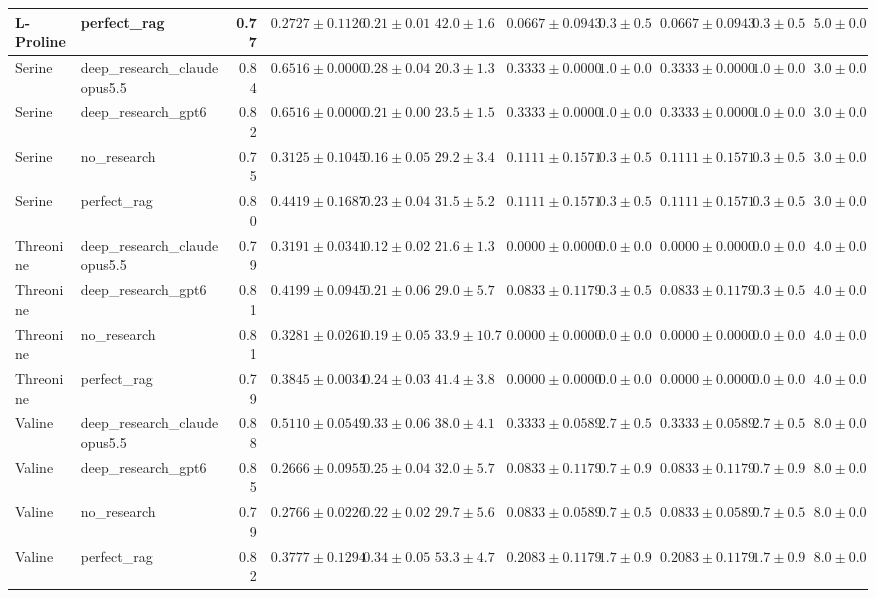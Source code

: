 \begin{table}[htbp]
\begin{tabular}{llrrrrrrrrr}
L-Proline & perfect_rag & 0.77 & $0.2727 \pm 0.1126$ & $0.21 \pm 0.01$ & $42.0 \pm 1.6$ & $0.0667 \pm 0.0943$ & $0.3 \pm 0.5$ & $0.0667 \pm 0.0943$ & $0.3 \pm 0.5$ & $5.0 \pm 0.0$ \\
\midrule
Serine & deep_research_claudeopus5.5 & 0.84 & \cellcolor{green!25}$0.6516 \pm 0.0000$ & $0.28 \pm 0.04$ & $20.3 \pm 1.3$ & $0.3333 \pm 0.0000$ & $1.0 \pm 0.0$ & $0.3333 \pm 0.0000$ & $1.0 \pm 0.0$ & $3.0 \pm 0.0$ \\
Serine & deep_research_gpt6 & 0.82 & \cellcolor{green!25}$0.6516 \pm 0.0000$ & $0.21 \pm 0.00$ & $23.5 \pm 1.5$ & $0.3333 \pm 0.0000$ & $1.0 \pm 0.0$ & $0.3333 \pm 0.0000$ & $1.0 \pm 0.0$ & $3.0 \pm 0.0$ \\
Serine & no_research & 0.75 & \cellcolor{red!25}$0.3125 \pm 0.1045$ & $0.16 \pm 0.05$ & $29.2 \pm 3.4$ & $0.1111 \pm 0.1571$ & $0.3 \pm 0.5$ & $0.1111 \pm 0.1571$ & $0.3 \pm 0.5$ & $3.0 \pm 0.0$ \\
Serine & perfect_rag & 0.80 & $0.4419 \pm 0.1687$ & $0.23 \pm 0.04$ & $31.5 \pm 5.2$ & $0.1111 \pm 0.1571$ & $0.3 \pm 0.5$ & $0.1111 \pm 0.1571$ & $0.3 \pm 0.5$ & $3.0 \pm 0.0$ \\
\midrule
Threonine & deep_research_claudeopus5.5 & 0.79 & \cellcolor{red!25}$0.3191 \pm 0.0341$ & $0.12 \pm 0.02$ & $21.6 \pm 1.3$ & $0.0000 \pm 0.0000$ & $0.0 \pm 0.0$ & $0.0000 \pm 0.0000$ & $0.0 \pm 0.0$ & $4.0 \pm 0.0$ \\
Threonine & deep_research_gpt6 & 0.81 & \cellcolor{green!25}$0.4199 \pm 0.0945$ & $0.21 \pm 0.06$ & $29.0 \pm 5.7$ & $0.0833 \pm 0.1179$ & $0.3 \pm 0.5$ & $0.0833 \pm 0.1179$ & $0.3 \pm 0.5$ & $4.0 \pm 0.0$ \\
Threonine & no_research & 0.81 & $0.3281 \pm 0.0261$ & $0.19 \pm 0.05$ & $33.9 \pm 10.7$ & $0.0000 \pm 0.0000$ & $0.0 \pm 0.0$ & $0.0000 \pm 0.0000$ & $0.0 \pm 0.0$ & $4.0 \pm 0.0$ \\
Threonine & perfect_rag & 0.79 & $0.3845 \pm 0.0034$ & $0.24 \pm 0.03$ & $41.4 \pm 3.8$ & $0.0000 \pm 0.0000$ & $0.0 \pm 0.0$ & $0.0000 \pm 0.0000$ & $0.0 \pm 0.0$ & $4.0 \pm 0.0$ \\
\midrule
Valine & deep_research_claudeopus5.5 & 0.88 & \cellcolor{green!25}$0.5110 \pm 0.0549$ & $0.33 \pm 0.06$ & $38.0 \pm 4.1$ & $0.3333 \pm 0.0589$ & $2.7 \pm 0.5$ & $0.3333 \pm 0.0589$ & $2.7 \pm 0.5$ & $8.0 \pm 0.0$ \\
Valine & deep_research_gpt6 & 0.85 & \cellcolor{red!25}$0.2666 \pm 0.0955$ & $0.25 \pm 0.04$ & $32.0 \pm 5.7$ & $0.0833 \pm 0.1179$ & $0.7 \pm 0.9$ & $0.0833 \pm 0.1179$ & $0.7 \pm 0.9$ & $8.0 \pm 0.0$ \\
Valine & no_research & 0.79 & $0.2766 \pm 0.0226$ & $0.22 \pm 0.02$ & $29.7 \pm 5.6$ & $0.0833 \pm 0.0589$ & $0.7 \pm 0.5$ & $0.0833 \pm 0.0589$ & $0.7 \pm 0.5$ & $8.0 \pm 0.0$ \\
Valine & perfect_rag & 0.82 & $0.3777 \pm 0.1294$ & $0.34 \pm 0.05$ & $53.3 \pm 4.7$ & $0.2083 \pm 0.1179$ & $1.7 \pm 0.9$ & $0.2083 \pm 0.1179$ & $1.7 \pm 0.9$ & $8.0 \pm 0.0$ \\
\bottomrule
\end{tabular}
\end{table}